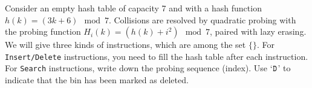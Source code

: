Consider an empty hash table of capacity 7 and with a hash function \(h(k) = (3k + 6) \mod 7\). Collisions are resolved by quadratic probing with the probing function \(H_i(k) = (h(k) + i^2)\mod 7\), paired with lazy erasing. We will give three kinds of instructions, which are among the set  $\{$$\}$. For \texttt{Insert/Delete} instructions, you need to fill the hash table after each instruction. For \texttt{Search} instructions, write down the probing sequence (index). Use `\(\texttt{D}\)' to indicate that the bin has been marked as deleted.

